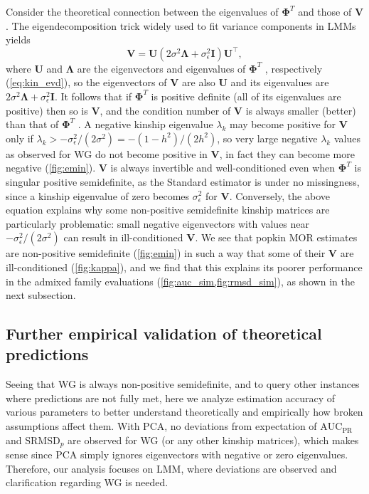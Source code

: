 \documentclass[11pt]{article}
\newcommand{\rmsd}{\text{SRMSD}_p}
\newcommand{\auc}{\text{AUC}_\text{PR}}
\newcommand{\kinMat}[1][T]{%
  \ensuremath{%
    \mathbf{\Phi}^{#1}
  }%
  \xspace%
}%
\begin{document}
Consider the theoretical connection between the eigenvalues of \kinMat and those of $\mathbf{V}$.
The eigendecomposition trick widely used to fit variance components in LMMs \citep{kang_efficient_2008, lippert_fast_2011, svishcheva_rapid_2012, zhou_genome-wide_2012, sul_population_2018} yields
$$
\mathbf{V} = \mathbf{U} \left( 2 \sigma^2 \mathbf{\Lambda} + \sigma^2_\epsilon \mathbf{I} \right) \mathbf{U}^\intercal,
$$
where $\mathbf{U}$ and $\mathbf{\Lambda}$ are the eigenvectors and eigenvalues of \kinMat, respectively (\cref{eq:kin_evd}),
so the eigenvectors of $\mathbf{V}$ are also $\mathbf{U}$ and its eigenvalues are $2 \sigma^2 \mathbf{\Lambda} + \sigma^2_\epsilon \mathbf{I}$.
It follows that if \kinMat is positive definite (all of its eigenvalues are positive) then so is $\mathbf{V}$, and the condition number of $\mathbf{V}$ is always smaller (better) than that of \kinMat.
A negative kinship eigenvalue $\lambda_k$ may become positive for $\mathbf{V}$ only if $\lambda_k  > -\sigma^2_\epsilon/(2\sigma^2) = -(1-h^2)/(2h^2)$, so very large negative $\lambda_k$ values as observed for WG do not become positive in $\mathbf{V}$, in fact they can become more negative (\cref{fig:emin}).
$\mathbf{V}$ is always invertible and well-conditioned even when \kinMat is singular positive semidefinite, as the Standard estimator is under no missingness, since a kinship eigenvalue of zero becomes $\sigma^2_\epsilon$ for $\mathbf{V}$.
Conversely, the above equation explains why some non-positive semidefinite kinship matrices are particularly problematic: small negative eigenvectors with values near $-\sigma^2_\epsilon/(2\sigma^2)$ can result in ill-conditioned $\mathbf{V}$.
We see that popkin MOR estimates are non-positive semidefinite (\cref{fig:emin}) in such a way that some of their $\mathbf{V}$ are ill-conditioned (\cref{fig:kappa}), and we find that this explains its poorer performance in the admixed family evaluations (\cref{fig:auc_sim,fig:rmsd_sim}), as shown in the next subsection.

\subsection{Further empirical validation of theoretical predictions}

Seeing that WG is always non-positive semidefinite, and to query other instances where predictions are not fully met, here we analyze estimation accuracy of various parameters to better understand theoretically and empirically how broken assumptions affect them.
With PCA, no deviations from expectation of $\auc$ and $\rmsd$ are observed for WG (or any other kinship matrices), which makes sense since PCA simply ignores eigenvectors with negative or zero eigenvalues.
Therefore, our analysis focuses on LMM, where deviations are observed and clarification regarding WG is needed.
\end{document}
